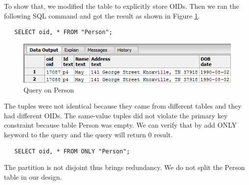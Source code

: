 \documentclass[11pt]{article}
\begin{document}
\par
To show that, we modified the table to explicitly store OIDs. Then we ran the following SQL command and got the result as shown in Figure \ref{fig:qonperson}.
\begin{verbatim}
   SELECT oid, * FROM "Person";
\end{verbatim}

\begin{figure}[!htp]
\centering
\includegraphics{F4.png}
\caption{Query on Person}
\label{fig:qonperson}
\end{figure}

\par
The tuples were not identical because they came from different tables and they had different OIDs. The same-value tuples did not violate the primary key constraint because table Person was empty. We can verify that by add ONLY keyword to the query and the query will return 0 result.
\begin{verbatim}
   SELECT oid, * FROM ONLY "Person";
\end{verbatim}

\par
The partition is not disjoint thus brings redundancy. We do not split the Person table in our design.
\end{document}
